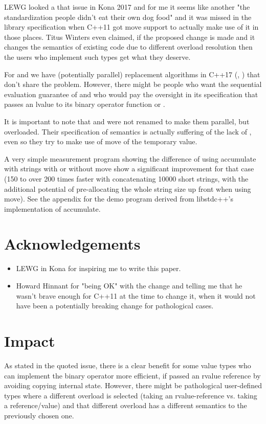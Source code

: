 \documentclass[ebook,11pt,article]{memoir}
\begin{document}
LEWG looked a that issue in Kona 2017 and for me it seems like another "the standardization people didn't eat their own dog food" and it was missed in the library specification when C++11 got move support to actually make use of it in those places. Titus Winters even claimed, if the proposed change is made and it changes the semantics of existing code due to different overload resolution then the users who implement such types get what they deserve.

For  and  we have (potentially parallel) replacement algorithms in C++17 (, ) that don't share the problem. However, there might be people who want the sequential evaluation guarantee of  and who would pay the oversight in its specification that passes an lvalue to its binary operator function or . 

It is important to note that  and  were not renamed to make them parallel, but overloaded. Their specification of semantics is actually suffering of the lack of , even so they try to make use of move of the temporary value. 

A very simple measurement program showing the difference of using accumulate with strings with or without move show a significant improvement for that case (150 to over 200 times faster with concatenating 10000 short strings, with the additional potential of pre-allocating the whole string size up front when using move). See the appendix for the demo program derived from libstdc++'s implementation of accumulate.

\chapter{Acknowledgements}
\begin{itemize}
\item LEWG in Kona for inspiring me to write this paper.
\item Howard Hinnant for "being OK" with the change and telling me that he wasn't brave enough for C++11 at the time to change it, when it would not have been a potentially breaking change for pathological cases.
\end{itemize}

\chapter{Impact}
As stated in the quoted issue, there is a clear benefit for some value types who can implement the binary operator more efficient, if passed an rvalue reference by avoiding copying internal state. However, there might be pathological user-defined types where a different overload is selected (taking an rvalue-reference vs. taking a reference/value) and that different overload has a different semantics to the previously chosen one.
\end{document}
